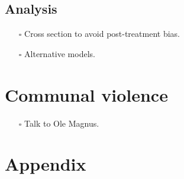 \documentclass[12pt]{article}
\begin{document}
\subsection{Analysis}
\begin{itemize}
	\item[$\square$] Cross section to avoid post-treatment bias.
	\item[$\square$] Alternative models.
\end{itemize}

\section{Communal violence}
\begin{itemize}
	\item[$\square$] Talk to Ole Magnus.
\end{itemize}
\section{}

\section{}

\pagebreak


{}

\section{Appendix}
\end{document}
